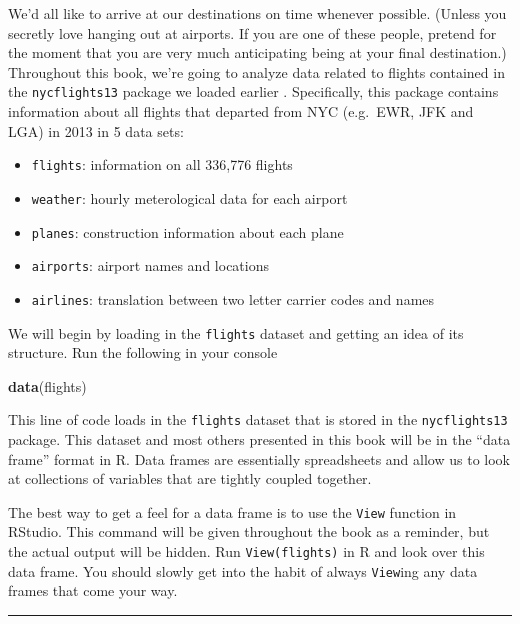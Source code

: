 \documentclass[]{tufte-book}
\newenvironment{Shaded}{\begin{snugshade}}{\end{snugshade}}
\newcommand{\KeywordTok}[1]{\textcolor[rgb]{0.13,0.29,0.53}{\textbf{{#1}}}}
\newcommand{\NormalTok}[1]{{#1}}
\let\oldrule=\rule
\renewcommand{\rule}[1]{\oldrule{\linewidth}}
\providecommand{\tightlist}{%
  \setlength{\itemsep}{0pt}\setlength{\parskip}{0pt}}
\theoremstyle{definition}
\theoremstyle{definition}
\theoremstyle{remark}
\begin{document}
We'd all like to arrive at our destinations on time whenever possible.
(Unless you secretly love hanging out at airports. If you are one of
these people, pretend for the moment that you are very much anticipating
being at your final destination.) Throughout this book, we're going to
analyze data related to flights contained in the \texttt{nycflights13}
package we loaded earlier \citep{R-nycflights13}. Specifically, this
package contains information about all flights that departed from NYC
(e.g.~EWR, JFK and LGA) in 2013 in 5 data sets:

\begin{itemize}
\tightlist
\item
  \texttt{flights}: information on all 336,776 flights
\item
  \texttt{weather}: hourly meterological data for each airport
\item
  \texttt{planes}: construction information about each plane
\item
  \texttt{airports}: airport names and locations
\item
  \texttt{airlines}: translation between two letter carrier codes and
  names
\end{itemize}

We will begin by loading in the \texttt{flights} dataset and getting an
idea of its structure. Run the following in your console

\begin{Shaded}
\begin{Highlighting}[]
\KeywordTok{data}\NormalTok{(flights)}
\end{Highlighting}
\end{Shaded}

This line of code loads in the \texttt{flights} dataset that is stored
in the \texttt{nycflights13} package. This dataset and most others
presented in this book will be in the ``data frame'' format in R. Data
frames are essentially spreadsheets and allow us to look at collections
of variables that are tightly coupled together.

The best way to get a feel for a data frame is to use the \texttt{View}
function in RStudio. This command will be given throughout the book as a
reminder, but the actual output will be hidden. Run
\texttt{View(flights)} in R and look over this data frame. You should
slowly get into the habit of always \texttt{View}ing any data frames
that come your way.

\begin{center}\rule{0.5\linewidth}{\linethickness}\end{center}
\end{document}
